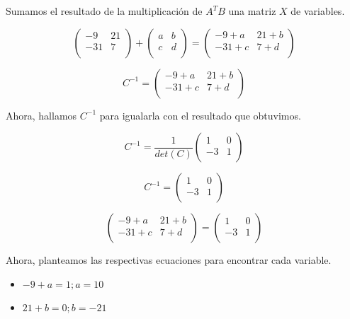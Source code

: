 \documentclass[11pt,a4paper]{article}
\begin{document}
\begin{enumerate}
Sumamos el resultado de la multiplicación de $A^{T}B$ una matriz $X$ de variables.

$$
\begin{pmatrix} 
-9 & 21 \\
-31  & 7 \\
\end{pmatrix}
+
\begin{pmatrix} 
a & b \\
c  & d \\
\end{pmatrix}
=
\begin{pmatrix} 
-9+a & 21+b \\
-31+c  & 7+d \\
\end{pmatrix}
$$

$$
C^{-1} =
\begin{pmatrix} 
-9+a & 21+b \\
-31+c  & 7+d \\
\end{pmatrix}
$$

Ahora, hallamos $C^{-1}$ para igualarla con el resultado que obtuvimos. 

$$
C^{-1} = \frac{1}{det(C)}
\begin{pmatrix} 
1 & 0 \\
-3  & 1 \\
\end{pmatrix}
$$

$$
C^{-1} =
\begin{pmatrix} 
1 & 0 \\
-3  & 1 \\
\end{pmatrix}
$$

$$
\begin{pmatrix} 
-9+a & 21+b \\
-31+c  & 7+d \\
\end{pmatrix}
=
\begin{pmatrix} 
1 & 0 \\
-3  & 1 \\
\end{pmatrix}
$$

Ahora, planteamos las respectivas ecuaciones para encontrar cada variable.

\begin{itemize}
\item $-9+a = 1; a = 10$ 
\end{itemize}

\begin{itemize}
\item $21+b=0; b = -21$ 
\end{itemize}


\end{enumerate}
\end{document}

